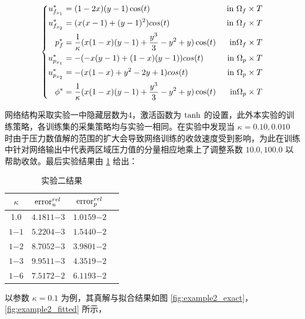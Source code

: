 \begin{equation}\label{eq:example2}
    \left\{
    \begin{aligned}
        \Ufi[1]^* &= (1 - 2 \* x) \* (y - 1) \* \cos(t) &\textrm{ in } \Df\\
        \Ufi[2]^* &= (x \* (x - 1) + (y - 1)^2) \* cos(t) &\textrm{ in } \Df\\
        \pf^* &= \frac{1}{\kappa} \* (x \* (1 - x) \* (y - 1) + \frac{y^3}{3} - y^2 + y) \* \cos(t) &\textrm{in} \Df\\
        \Upi[1]^* &= -(-x \* (y - 1) + (1 - x) \* (y - 1))\* cos(t) &\textrm{ in } \Dp\\
        \Upi[2]^* &= -(x \* (1 - x) + y^2 - 2 \* y + 1) \* cos(t) &\textrm{ in } \Dp\\
        \pp^* &= \frac{1}{\kappa} \* (x \* (1 - x) \* (y - 1) + \frac{y^3}{3} - y^2 + y) \* \cos(t) &\textrm{in} \Dp
    \end{aligned}
    \right.
\end{equation}

网络结构采取实验一中隐藏层数为4，激活函数为 $\tanh$ 的设置，此外本实验的训练策略，各训练集的采集策略均与实验一相同。在实验中发现当 $\kappa = 0.10, 0.010$ 时由于压力数值解的范围的扩大会导致网络训练的收敛速度受到影响，为此在训练中针对网络输出中代表两区域压力值的分量相应地乘上了调整系数 $10.0,100.0$ 以帮助收敛。最后实验结果由 \ref{tab:example2} 给出：

\begin{table}[H]
    \centering
    \caption{实验二结果}
    \begin{tabular}{cccc}
        \toprule
        $\kappa$ & $\mathrm{error}^{rel}_{u}$ & $\mathrm{error}^{rel}_{p}$ \\
        \midrule
        1.0        & $\num{4.1811}{-3}$ & $\num{1.0159}{-2}$ \\
        $\num{1}{-1}$ & $\num{5.2204}{-3}$ & $\num{1.5440}{-2}$ \\
        $\num{1}{-2}$ & $\num{8.7052}{-3}$ & $\num{3.9801}{-2}$ \\
        $\num{1}{-3}$ & $\num{9.9511}{-3}$ & $\num{4.3519}{-2}$ \\
        $\num{1}{-6}$ & $\num{7.5172}{-2}$ & $\num{6.1193}{-2}$ \\
        \bottomrule
    \end{tabular}
    \label{tab:example2}
\end{table}

以参数 $\kappa = 0.1$ 为例，其真解与拟合结果如图 \ref{fig:example2_exact}，\ref{fig:example2_fitted} 所示，


